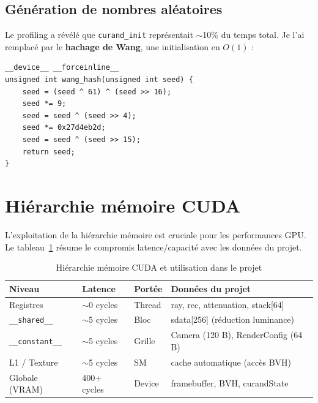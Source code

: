 \documentclass[12pt,a4paper]{article}
\begin{document}
\subsection{Génération de nombres aléatoires}

Le profiling a révélé que \texttt{curand\_init} représentait $\sim$10\% du temps total. Je l'ai remplacé par le \textbf{hachage de Wang}, une initialisation en $O(1)$ :

\begin{lstlisting}[caption={Initialisation rapide via Wang hash}]
__device__ __forceinline__
unsigned int wang_hash(unsigned int seed) {
    seed = (seed ^ 61) ^ (seed >> 16);
    seed *= 9;
    seed = seed ^ (seed >> 4);
    seed *= 0x27d4eb2d;
    seed = seed ^ (seed >> 15);
    return seed;
}
\end{lstlisting}

\section{Hiérarchie mémoire CUDA}

L'exploitation de la hiérarchie mémoire est cruciale pour les performances GPU. Le tableau~\ref{tab:mem_hierarchy} résume le compromis latence/capacité avec les données du projet.

\begin{table}[H]
\centering
\small
\caption{Hiérarchie mémoire CUDA et utilisation dans le projet}
\begin{tabular}{llll}
\toprule
\textbf{Niveau} & \textbf{Latence} & \textbf{Portée} & \textbf{Données du projet} \\
\midrule
Registres & $\sim$0 cycles & Thread & ray, rec, attenuation, stack[64] \\
\texttt{\_\_shared\_\_} & $\sim$5 cycles & Bloc & sdata[256] (réduction luminance) \\
\texttt{\_\_constant\_\_} & $\sim$5 cycles & Grille & Camera (120 B), RenderConfig (64 B) \\
L1 / Texture & $\sim$5 cycles & SM & cache automatique (accès BVH) \\
Globale (VRAM) & 400+ cycles & Device & framebuffer, BVH, curandState \\
\bottomrule
\end{tabular}
\label{tab:mem_hierarchy}
\end{table}
\end{document}
